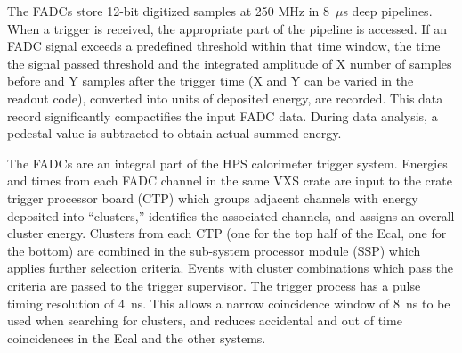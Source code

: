 The FADCs store 12-bit digitized samples at 250 MHz in 8~$\mu$s deep pipelines. 
When a trigger is received, the appropriate part of the pipeline is accessed. If an FADC   
signal exceeds a predefined threshold within that time window, the time the signal passed threshold and the integrated
amplitude of X number of samples before and Y samples after the trigger time (X and Y can be varied in the readout code), 
converted into units of deposited energy, are recorded. This data record significantly compactifies the  
input FADC data. During data analysis, a pedestal value is subtracted to obtain actual summed energy.

The FADCs are an integral part of the HPS calorimeter trigger system. Energies  
and times from each FADC channel in the same VXS crate are input to the crate trigger
processor board (CTP) which groups adjacent channels with energy deposited into ``clusters,'' identifies the associated channels, and
assigns an overall cluster energy. Clusters  
from each CTP (one for the top half of the Ecal, one for the bottom) are combined in the sub-system processor module (SSP) 
which applies further selection criteria. Events with cluster combinations which pass the criteria are
passed to the trigger supervisor. The trigger process has a pulse timing resolution of 4~ns. This allows a narrow 
coincidence window of 8~ns to be used when searching for clusters, and reduces accidental and out of time coincidences in the Ecal
and the other systems. 





